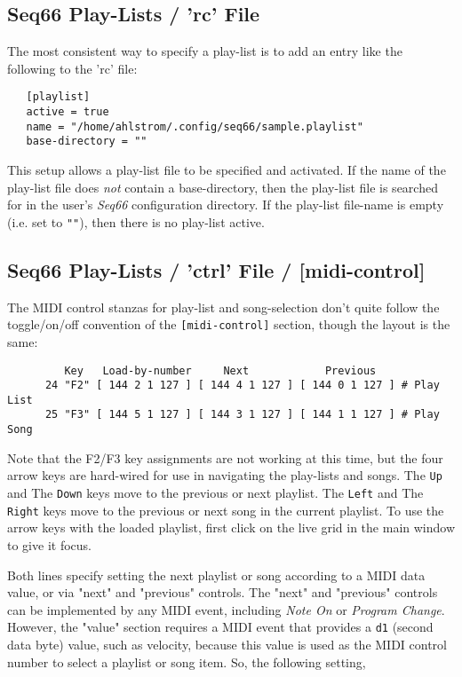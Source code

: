 \subsection{Seq66 Play-Lists / 'rc' File}
\label{subsec:playlist_rc_file}

   The most consistent way to specify a play-list is to add an entry like the
   following to the 'rc' file:

   \begin{verbatim}
   [playlist]
   active = true
   name = "/home/ahlstrom/.config/seq66/sample.playlist"
   base-directory = ""
   \end{verbatim}

   This setup allows a play-list file to be specified and activated.
   If the name of the play-list file does \textsl{not} contain a base-directory,
   then the play-list file is searched for in the user's \textsl{Seq66}
   configuration directory.
   If the play-list file-name is empty (i.e. set to \texttt{""}), then there is
   no play-list active.

\subsection{Seq66 Play-Lists / 'ctrl' File / [midi-control]}
\label{subsec:playlist_rc_file_midi_ctrl}

   The MIDI control stanzas for play-list and song-selection don't quite follow
   the toggle/on/off convention of the \texttt{[midi-control]} section, though
   the layout is the same:

   \begin{verbatim}
         Key   Load-by-number     Next            Previous
      24 "F2" [ 144 2 1 127 ] [ 144 4 1 127 ] [ 144 0 1 127 ] # Play List
      25 "F3" [ 144 5 1 127 ] [ 144 3 1 127 ] [ 144 1 1 127 ] # Play Song
   \end{verbatim}

   Note that the F2/F3 key assignments are not working at this
   time, but the four
   arrow keys are hard-wired for use in navigating the play-lists and songs.
   The \texttt{Up} and The \texttt{Down} keys move to the previous or next
   playlist.
   The \texttt{Left} and
   The \texttt{Right} keys move to the previous or next song in the current
   playlist.
   To use the arrow keys with the loaded playlist, first click on
   the live grid in the main window to give it focus.

   Both lines specify setting the next playlist or song according to a 
   MIDI data value,
   or via "next" and "previous" controls.  The "next" and "previous" controls
   can be implemented by any MIDI event, including \textsl{Note On} or
   \textsl{Program Change}.  However, the "value" section requires a MIDI event
   that provides a \texttt{d1} (second data byte) value, such as velocity,
   because this value is
   used as the MIDI control number to select a playlist or song item.
   So, the following setting,


